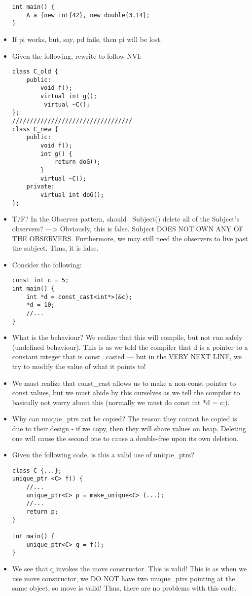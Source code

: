 \documentclass{article}
\begin{document}
\begin{itemize}
\begin{lstlisting}
int main() {
    A a {new int{42}, new double{3.14};
}
\end{lstlisting}
\item If pi works, but, say, pd fails, then pi will be lost.
\item Given the following, rewrite to follow NVI:
\begin{lstlisting}
class C_old {
    public:
        void f();
        virtual int g();
         virtual ~C();
};
//////////////////////////////////
class C_new {
    public:
        void f();
        int g() {
            return doG();
        }
        virtual ~C();
    private:
        virtual int doG();
};
\end{lstlisting}
\item T/F?  In the Observer pattern, should ~Subject() delete all of the Subject's observers?  ---> Obviously, this is false.  Subject DOES NOT OWN ANY OF THE OBSERVERS.  Furthermore, we may still need the observers to live past the subject.  Thus, it is false.
\item Consider the following:
\begin{lstlisting}
const int c = 5;
int main() {
    int *d = const_cast<int*>(&c);
    *d = 10;
    //...
}
\end{lstlisting}
\item What is the behaviour?  We realize that this will compile, but not run safely (undefined behaviour).  This is as we told the compiler that d is a pointer to a constant integer that is const\_casted --- but in the VERY NEXT LINE, we try to modify the value of what it points to!  
\item We must realize that const\_cast allows us to make a non-const pointer to const values, but we must abide by this ourselves as we tell the compiler to basically not worry about this (normally we must do const int *d = c;).
\item Why can unique\_ptrs not be copied?  The reason they cannot be copied is due to their design - if we copy, then they will share values on heap.  Deleting one will cause the second one to cause a double-free upon its own deletion.
\item Given the following code, is this a valid use of unique\_ptrs?
\begin{lstlisting}
class C {...};
unique_ptr <C> f() {
    //...
    unique_ptr<C> p = make_unique<C> (...);
    //...
    return p;
}

int main() {
    unique_ptr<C> q = f();
}
\end{lstlisting}
\item We see that q invokes the move constructor.  This is valid!  This is as when we use move constructor, we DO NOT have two unique\_ptrs pointing at the same object, so move is valid!  Thus, there are no problems with this code.
\end{itemize}
\end{document}
